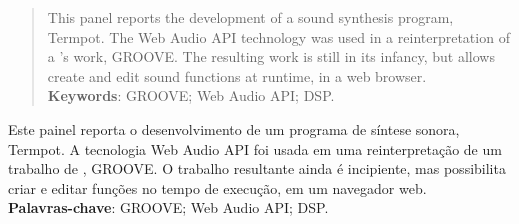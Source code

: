 \documentclass[12pt]{article}
\begin{document}
 

\maketitle


\begin{abstract}
This panel reports the development of a sound synthesis program, Termpot. The Web Audio API technology was used in a reinterpretation of a \cite{mathews_groove_1970}'s work, GROOVE. The resulting work is still in its infancy, but allows create and edit sound functions at runtime, in a web browser.
\ \\
\textbf{Keywords}: GROOVE; Web Audio API; DSP.
\end{abstract}


\begin{resumo} 
Este painel reporta o desenvolvimento de um programa de síntese sonora, Termpot. A tecnologia Web Audio API foi usada em uma reinterpretação de um trabalho de \cite{mathews_groove_1970}, GROOVE. O trabalho resultante ainda é incipiente, mas possibilita criar e editar funções no tempo de execução, em um navegador web.
\ \\
\textbf{Palavras-chave}: GROOVE; Web Audio API; DSP.
\end{resumo}



%

%

 


\end{document}
